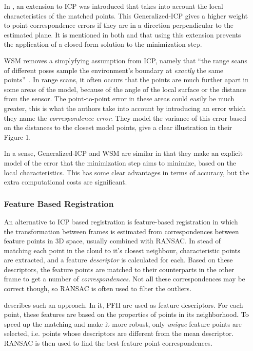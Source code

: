 \documentclass[a4paper]{article}
\begin{document}
In \cite{segal2009generalized}, an extension to \ac{ICP} was introduced that takes into account the local characteristics of the matched points. This Generalized-ICP gives a higher weight to point correspondence errors if they are in a direction perpendicular to the estimated plane. It is mentioned in both \cite{rusinkiewicz2001efficient} and \cite{segal2009generalized} that using this extension prevents the application of a closed-form solution to the minimization step.

\ac{WSM} removes a simplyfying assumption from \ac{ICP}, namely that ``the range scans of different poses sample the environment's boundary at \emph{exactly} the same points''~\cite{pfister2002weighted}. In range scans, it often occurs that the points are much further apart in some areas of the model, because of the angle of the local surface or the distance from the sensor. The point-to-point error in these areas could easily be much greater, this is what the authors take into account by introducing an error which they name the \emph{correspondence error}. They model the variance of this error based on the distances to the closest model points, \cite{slamet2008boosting} give a clear illustration in their Figure 1. 

In a sense, Generalized-ICP and \ac{WSM} are similar in that they make an explicit model of the error that the minimization step aims to minimize, based on the local characteristics. This has some clear advantages in terms of accuracy, but the extra computational costs are significant.

\subsubsection{Feature Based Registration}

An alternative to \ac{ICP} based registration is feature-based registration in which the transformation between frames is estimated from correspondences between feature points in 3D space, usually combined with \ac{RANSAC}. In stead of matching each point in the cloud to it's closest neighbour, characteristic points are extracted, and a feature \emph{descriptor} is calculated for each. Based on these descriptors, the feature points are matched to their counterparts in the other frame to get a number of \emph{correspondences}. Not all these correspondences may be correct though, so \ac{RANSAC} is often used to filter the outliers. 

\cite{rusu2009fast} describes such an approach. In it, \ac{PFH} are used as feature descriptors. For each point, these features are based on the properties of points in its neighborhood. To speed up the matching and make it more robust, only \emph{unique} feature points are selected, i.e. points whose descriptors are different from the mean descriptor. \ac{RANSAC} is then used to find the best feature point correspondences.  
\end{document}
